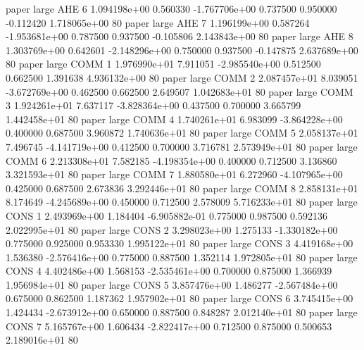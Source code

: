               paper      large      AHE                 6 1.094198e+00      0.560330 -1.767706e+00 0.737500 0.950000      -0.112420 1.718065e+00 80
              paper      large      AHE                 7 1.196199e+00      0.587264 -1.953681e+00 0.787500 0.937500      -0.105806 2.143843e+00 80
              paper      large      AHE                 8 1.303769e+00      0.642601 -2.148296e+00 0.750000 0.937500      -0.147875 2.637689e+00 80
              paper      large     COMM                 1 1.976990e+01      7.911051 -2.985540e+00 0.512500 0.662500       1.391638 4.936132e+00 80
              paper      large     COMM                 2 2.087457e+01      8.039051 -3.672769e+00 0.462500 0.662500       2.649507 1.042683e+01 80
              paper      large     COMM                 3 1.924261e+01      7.637117 -3.828364e+00 0.437500 0.700000       3.665799 1.442458e+01 80
              paper      large     COMM                 4 1.740261e+01      6.983099 -3.864228e+00 0.400000 0.687500       3.960872 1.740636e+01 80
              paper      large     COMM                 5 2.058137e+01      7.496745 -4.141719e+00 0.412500 0.700000       3.716781 2.573949e+01 80
              paper      large     COMM                 6 2.213308e+01      7.582185 -4.198354e+00 0.400000 0.712500       3.136860 3.321593e+01 80
              paper      large     COMM                 7 1.880580e+01      6.272960 -4.107965e+00 0.425000 0.687500       2.673836 3.292446e+01 80
              paper      large     COMM                 8 2.858131e+01      8.174649 -4.245689e+00 0.450000 0.712500       2.578009 5.716233e+01 80
              paper      large     CONS                 1 2.493969e+00      1.184404 -6.905882e-01 0.775000 0.987500       0.592136 2.022995e+01 80
              paper      large     CONS                 2 3.298023e+00      1.275133 -1.330182e+00 0.775000 0.925000       0.953330 1.995122e+01 80
              paper      large     CONS                 3 4.419168e+00      1.536380 -2.576416e+00 0.775000 0.887500       1.352114 1.972805e+01 80
              paper      large     CONS                 4 4.402486e+00      1.568153 -2.535461e+00 0.700000 0.875000       1.366939 1.956984e+01 80
              paper      large     CONS                 5 3.857476e+00      1.486277 -2.567484e+00 0.675000 0.862500       1.187362 1.957902e+01 80
              paper      large     CONS                 6 3.745415e+00      1.424434 -2.673912e+00 0.650000 0.887500       0.848287 2.012140e+01 80
              paper      large     CONS                 7 5.165767e+00      1.606434 -2.822417e+00 0.712500 0.875000       0.500653 2.189016e+01 80
